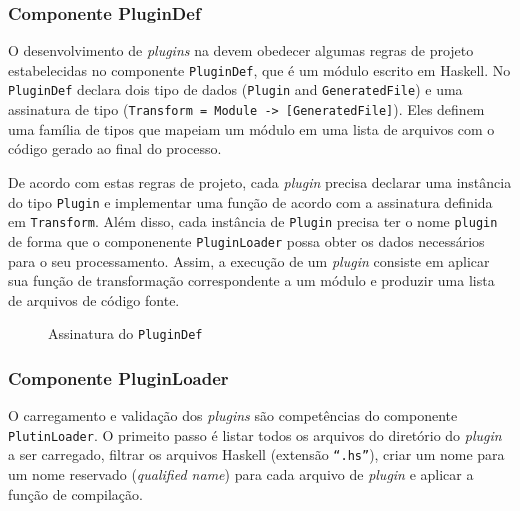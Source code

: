 \subsubsection{Componente PluginDef}{\label{sec:plugindef}}

O desenvolvimento de \textit{plugins} na \neoidl{} devem obedecer algumas regras
de projeto estabelecidas no componente \texttt{PluginDef}, que é um módulo
escrito em Haskell. No \texttt{PluginDef} declara dois tipo de dados
(\texttt{Plugin} and \texttt{GeneratedFile}) e uma assinatura de tipo
(\texttt{Transform = Module -> [GeneratedFile]}). Eles definem uma família de
tipos que mapeiam um módulo \neoidl{} em uma lista de arquivos com o código
gerado ao final do processo.

De acordo com estas regras de projeto, cada \textit{plugin} precisa declarar uma
instância do tipo \texttt{Plugin} e implementar uma função de acordo com a
assinatura definida em \texttt{Transform}. Além disso, cada instância de  
\texttt{Plugin} precisa ter o nome \texttt{plugin} de forma que o componenente
\texttt{PluginLoader} possa obter os dados necessários para o seu processamento.
Assim, a execução de um \textit{plugin} consiste em aplicar sua função de
transformação correspondente a um módulo \neoidl{} e produzir uma lista de
arquivos de código fonte. 

\vspace{6mm}

\begin{figure}[h]
\begin{small}

\vspace{-.5cm}
\end{small}
\caption{Assinatura do \texttt{PluginDef}}
\label{lst:pluginDef}
\end{figure}

\subsubsection{Componente PluginLoader}

O carregamento e validação dos \textit{plugins} são competências do componente
\texttt{PlutinLoader}. O primeito passo é listar todos os arquivos do diretório
do \textit{plugin} a ser carregado, filtrar os arquivos Haskell (extensão
\texttt{``.hs''}), criar um nome para um nome reservado (\textit{qualified
name}) para cada arquivo de \textit{plugin} e aplicar a função de compilação.

